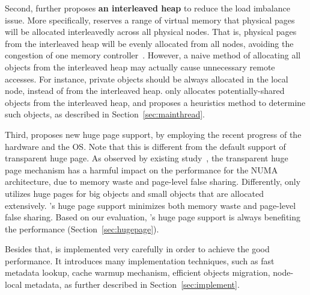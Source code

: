 Second, \NM{} further proposes \textbf{an interleaved heap} to reduce the load imbalance issue. More specifically, \NM{} reserves a range of virtual memory that physical pages will be allocated interleavedly across all physical nodes. That is, physical pages from the interleaved heap will be evenly allocated from all nodes, avoiding the congestion of one memory controller~\cite{Blagodurov:2011:CNC:2002181.2002182}. However, a naive method of allocating all objects from the interleaved heap may actually cause unnecessary remote accesses. For instance, private objects should be always allocated in the local node, instead of from the interleaved heap. \NM{} only allocates potentially-shared objects from the interleaved heap, and proposes a heuristics method to determine such objects, as described in Section~\ref{sec:mainthread}.  

 Third, \NM{} proposes new huge page support, by employing the recent progress of the hardware and the OS. Note that this is different from the default support of transparent huge page. As observed by existing study~\cite{Gaud:2014:LPM:2643634.2643659, DBLP:conf/asplos/PanwarBG19}, the transparent huge page mechanism has a harmful impact on the performance for the NUMA architecture, due to memory waste and page-level false sharing. Differently, \NM{} only utilizes huge pages for big objects and small objects that are allocated extensively. \NM{}'s huge page support minimizes both memory waste and page-level false sharing. Based on our evaluation, \NM{}'s huge page support is always benefiting the performance (Section~\ref{sec:hugepage}). 
 
 Besides that, \NM{} is implemented very carefully in order to achieve the good performance. It introduces many implementation techniques, such as fast metadata lookup, cache warmup mechanism, efficient objects migration, node-local metadata, as further described in Section~\ref{sec:implement}. 
 



